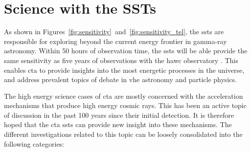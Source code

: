 \section{Science with the SSTs}

As shown in Figures~\ref{fig:sensitivity}~and~\ref{fig:sensitivity_tel}, the \glspl{sst} are responsible for exploring beyond the current energy frontier in gamma-ray astronomy. Within 50 hours of observation time, the \glspl{sst} will be able provide the same sensitivity as five years of observations with the \gls{hawc} observatory \cite{Consortium2018}. This enables \gls{cta} to provide insights into the most energetic processes in the universe, and address prevalent topics of debate in \gls{vhe} astronomy and particle physics.

The high energy science cases of \gls{cta} are mostly concerned with the acceleration mechanisms that produce high energy cosmic rays. This has been an active topic of discussion in the past 100 years since their initial detection. It is therefore hoped that the \gls{cta} \glspl{sst} can provide new insight into these mechanisms. The different investigations related to this topic can be loosely consolidated into the following categories:
